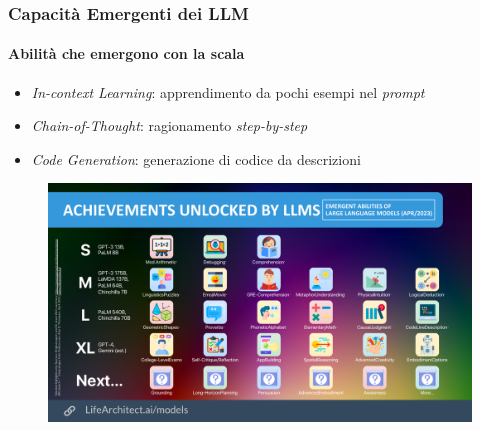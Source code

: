%
\begin{frame}[t,fragile] \frametitle{Capacità Emergenti dei LLM}
    \framesubtitle{Abilità che emergono con la scala}
    {\small
        \begin{itemize}[leftmargin=10pt,align=right]
            \item[\alert{\faArrowCircleRight}] \alert{\textit{In-context Learning}:} apprendimento da pochi esempi nel \textit{prompt}
            \item[\alert{\faArrowCircleRight}] \alert{\textit{Chain-of-Thought}:} ragionamento \textit{step-by-step}
            \item[\alert{\faArrowCircleRight}] \alert{\textit{Code Generation}:} generazione di codice da descrizioni
        \end{itemize}
    }
    \begin{minipage}[t]{\textwidth}
        \begin{figure}
            \centering
            \includegraphics[width=.8\textwidth]{img/LLm-emerging.pdf}
        \end{figure}
    \end{minipage}
\end{frame}
%
